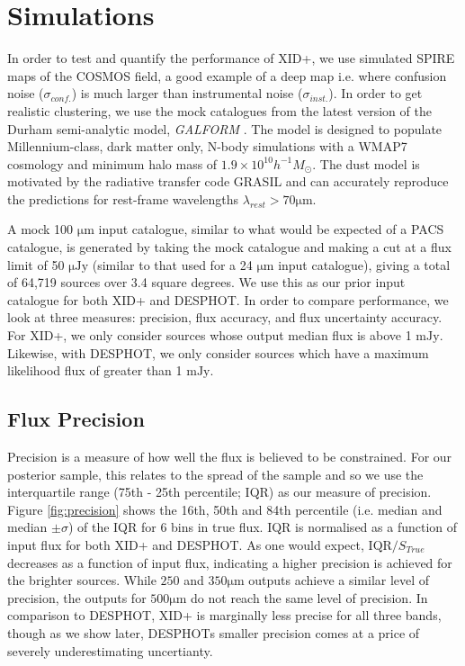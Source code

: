 \documentclass[useAMS,usenatbib]{mnras}
\begin{document}
\section{Simulations}\label{sec:sims}
In order to test and quantify the performance of XID+, we use simulated SPIRE maps of the COSMOS field, a good example of a deep map i.e. where confusion noise ($\sigma_{conf.}$) is much larger than instrumental noise ($\sigma_{inst.}$). In order to get realistic clustering, we use the mock catalogues from the latest version of the Durham semi-analytic model, \emph{GALFORM} \citep{Lacey:2015,Cowley:2014}. The model is designed to populate Millennium-class, dark matter only, N-body simulations with a WMAP7 cosmology and minimum halo mass of $1.9 \times 10^{10} h^{-1} M_{\odot}$. The dust model is motivated by the radiative transfer code GRASIL \citep{Silva:1998} and can accurately reproduce the predictions for rest-frame wavelengths $\lambda_{rest} > 70 \mathrm{\mu m}$.

A mock 100 $\mathrm{\mu m}$ input catalogue, similar to what would be expected of a PACS catalogue, is generated by taking the mock catalogue and making a cut at a flux limit of 50 $\mathrm{\mu Jy}$ (similar to that used for a 24 $\mathrm{\mu m}$ input catalogue), giving a total of 64,719 sources over 3.4 square degrees. We use this as our prior input catalogue for both \textsc{XID+} and \textsc{DESPHOT}. In order to compare performance, we look at three measures: precision, flux accuracy, and flux uncertainty accuracy. For \textsc{XID+}, we only consider sources whose output median flux is above 1 $\mathrm{mJy}$. Likewise, with \textsc{DESPHOT}, we only consider sources which have a maximum likelihood flux of greater than 1 $\mathrm{mJy}$. 

\subsection{Flux Precision}
\label{sec:prec}
Precision is a measure of how well the flux is believed to be constrained. For our posterior sample, this relates to the spread of the sample and so we use the interquartile range (75th - 25th percentile; IQR) as our measure of precision. Figure \ref{fig:precision} shows the 16th, 50th and 84th percentile (i.e. median and median $\pm \sigma$) of the IQR for 6 bins in true flux. IQR is normalised as a function of input flux for both \textsc{XID+} and \textsc{DESPHOT}. As one would expect, $\mathrm{IQR}/S_{True}$ decreases as a function of input flux, indicating a higher precision is achieved for the brighter sources. While $250$ and $350\mathrm{\mu m}$ outputs achieve a similar level of precision, the outputs for $500 \mathrm{\mu m}$ do not reach the same level of precision. In comparison to \textsc{DESPHOT}, \textsc{XID+} is marginally less precise for all three bands, though as we show later, \textsc{DESPHOT}s smaller precision comes at a price of severely underestimating uncertianty. 
\end{document}
